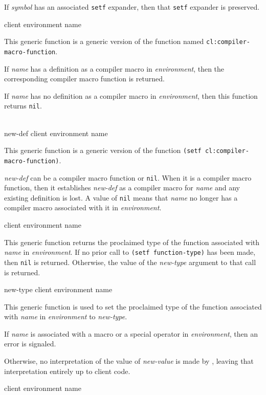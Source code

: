 If \textit{symbol} has an associated \texttt{setf} expander, then that
\texttt{setf} expander is preserved.

 {client environment name}

This generic function is a generic version of the \commonlisp{}
function named \texttt{cl:compiler-macro-function}.

If \textit{name} has a definition as a compiler macro in
\textit{environment}, then the corresponding compiler macro function
is returned.

If \textit{name} has no definition as a compiler macro in
\textit{environment}, then this function returns \texttt{nil}.

\\
{new-def client environment name}

This generic function is a generic version of the \commonlisp{}
function \texttt{(setf cl:compiler-macro-function)}.

\textit{new-def} can be a compiler macro function or \texttt{nil}.
When it is a compiler macro function, then it establishes
\textit{new-def} as a compiler macro for \textit{name} and
any existing definition is lost.  A value of \texttt{nil} means that
\textit{name} no longer has a compiler macro associated with
it in \textit{environment}.

 {client environment name}

This generic function returns the proclaimed type of the function
associated with \textit{name} in \textit{environment}.  If no
prior call to \texttt{(setf function-type)} has been made, then
\texttt{nil} is returned.  Otherwise, the value of the
\textit{new-type} argument to that call is returned.

 {new-type client environment name}

This generic function is used to set the proclaimed type of the
function associated with \textit{name} in
\textit{environment} to \textit{new-type}.

If \textit{name} is associated with a macro or a special
operator in \textit{environment}, then an error is signaled.

Otherwise, no interpretation of the value of \textit{new-value} is
made by \sysname{}, leaving that interpretation entirely up to client
code.

 {client environment name}

